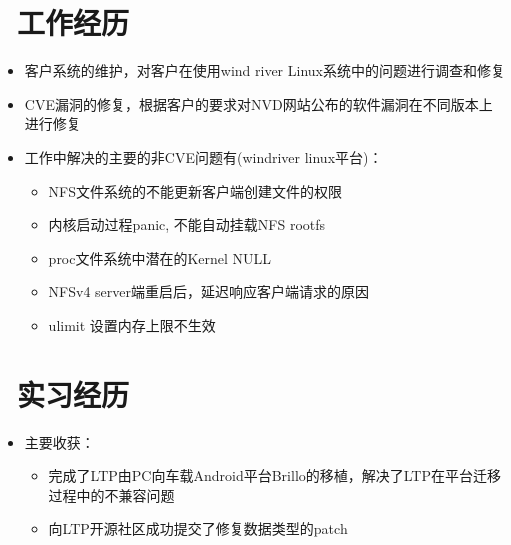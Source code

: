 \documentclass{resume}
\begin{document}



\section{\faUsers\ 工作经历}
\begin{itemize}
    \item {客户系统的维护，对客户在使用wind river Linux系统中的问题进行调查和修复}    
	\item {CVE漏洞的修复，根据客户的要求对NVD网站公布的软件漏洞在不同版本上进行修复}
    \item {工作中解决的主要的非CVE问题有(windriver linux平台)：}
    \begin{itemize}
        \item {NFS文件系统的不能更新客户端创建文件的权限}
        \item {内核启动过程panic, 不能自动挂载NFS rootfs}
        \item {proc文件系统中潜在的Kernel NULL}
        \item {NFSv4 server端重启后，延迟响应客户端请求的原因}
        \item {ulimit 设置内存上限不生效}
    \end{itemize}
\end{itemize}


\section{\faUsers\ 实习经历}
\begin{itemize}
    \item {主要收获：}
    \begin{itemize}
        \item {完成了LTP由PC向车载Android平台Brillo的移植，解决了LTP在平台迁移过程中的不兼容问题}
        \item {向LTP开源社区成功提交了修复数据类型的patch}
    \end{itemize}
\end{itemize}
\end{document}
